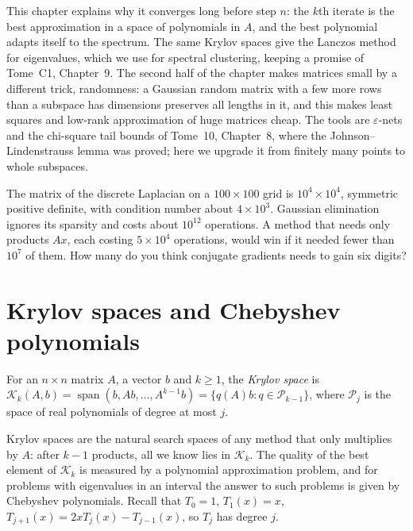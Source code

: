 This chapter explains why it converges long before step $n$: the $k$th iterate is the best approximation in a space of polynomials in $A$, and the
best polynomial adapts itself to the spectrum. The same Krylov spaces give the Lanczos method for eigenvalues, which we use for spectral clustering,
keeping a promise of Tome~C1, Chapter~9. The second half of the chapter makes matrices small by a different trick, randomness: a Gaussian random
matrix with a few more rows than a subspace has dimensions preserves all lengths in it, and this makes least squares and low-rank approximation of
huge matrices cheap. The tools are $\varepsilon$-nets and the chi-square tail bounds of Tome~10, Chapter~8, where the Johnson--Lindenstrauss lemma was
proved; here we upgrade it from finitely many points to whole subspaces.

\begin{think}
The matrix of the discrete Laplacian on a $100\times100$ grid is $10^4\times10^4$, symmetric positive definite, with condition number about
$4\times10^3$. Gaussian elimination ignores its sparsity and costs about $10^{12}$ operations. A method that needs only products $Ax$, each costing
$5\times10^4$ operations, would win if it needed fewer than $10^7$ of them. How many do you think conjugate gradients needs to gain six digits?
\end{think}

\section{Krylov spaces and Chebyshev polynomials}\label{sec:krylovspaces}

\begin{definition}\label{def:krylov}
For an $n\times n$ matrix $A$, a vector $b$ and $k\ge1$, the \emph{Krylov space} is $\mathcal K_k(A,b)=\operatorname{span}(b,Ab,\dots,A^{k-1}b)=\{q(A)b:q\in\mathcal P_{k-1}\}$,
where $\mathcal P_j$ is the space of real polynomials of degree at most $j$.
\end{definition}

Krylov spaces are the natural search spaces of any method that only multiplies by $A$: after $k-1$ products, all we know lies in $\mathcal K_k$. The
quality of the best element of $\mathcal K_k$ is measured by a polynomial approximation problem, and for problems with eigenvalues in an interval
the answer to such problems is given by Chebyshev polynomials. Recall that $T_0=1$, $T_1(x)=x$, $T_{j+1}(x)=2xT_j(x)-T_{j-1}(x)$, so $T_j$ has degree $j$.

